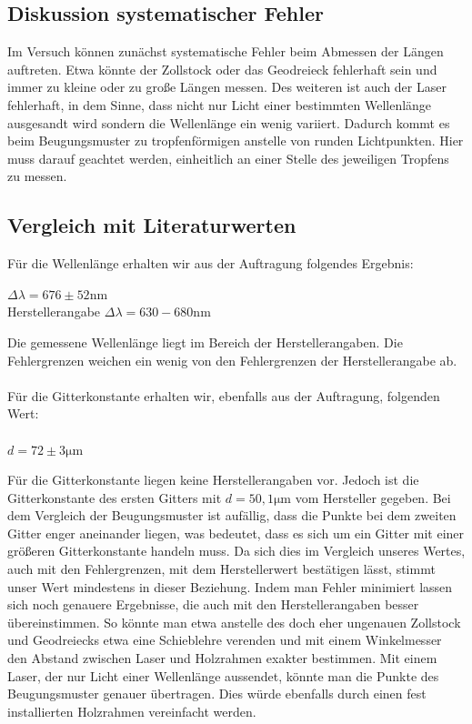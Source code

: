 \documentclass[12pt,a4paper,titlepage,headinclude,bibtotoc]{scrartcl}
\begin{document}
\subsection{Diskussion systematischer Fehler}
Im Versuch können zunächst systematische Fehler beim Abmessen der Längen auftreten. Etwa könnte der Zollstock oder das Geodreieck fehlerhaft sein und immer zu kleine oder zu große Längen messen. Des weiteren ist auch der Laser fehlerhaft, in dem Sinne, dass nicht nur Licht einer bestimmten Wellenlänge ausgesandt wird sondern die Wellenlänge ein wenig variiert. Dadurch kommt es beim Beugungsmuster zu tropfenförmigen anstelle von runden Lichtpunkten. Hier muss darauf geachtet werden, einheitlich an einer Stelle des jeweiligen Tropfens zu messen.

  
\subsection{Vergleich mit Literaturwerten}

Für die Wellenlänge erhalten wir aus der Auftragung folgendes Ergebnis:\\
\begin{center}
$\Delta \lambda = 676 \pm 52 \mathrm {nm} $\\
Herstellerangabe $ \Delta \lambda = 630-680 \mathrm {nm} $\\
\end{center}

Die gemessene Wellenlänge liegt im Bereich der Herstellerangaben. Die Fehlergrenzen weichen ein wenig von den Fehlergrenzen der Herstellerangabe ab.\\\\

Für die Gitterkonstante erhalten wir, ebenfalls aus der Auftragung, folgenden Wert:\\\\
\centering
$ d = 72 \pm 3 \mathrm{\mu m} $\\

\begin{flushleft}
Für die Gitterkonstante liegen keine Herstellerangaben vor. Jedoch ist die Gitterkonstante des ersten Gitters mit $d = 50,1 \mathrm{\mu m} $ vom Hersteller gegeben. Bei dem Vergleich der Beugungsmuster ist aufällig, dass die Punkte bei dem zweiten Gitter enger aneinander liegen, was bedeutet, dass es sich um ein Gitter mit einer größeren Gitterkonstante handeln muss. Da sich dies im Vergleich unseres Wertes, auch mit den Fehlergrenzen, mit dem Herstellerwert bestätigen lässt, stimmt unser Wert mindestens in dieser Beziehung.
\vspace{1cm}
Indem man Fehler minimiert lassen sich noch genauere Ergebnisse, die auch mit den Herstellerangaben besser übereinstimmen. So könnte man etwa anstelle des doch eher ungenauen Zollstock und Geodreiecks etwa eine Schieblehre verenden und mit einem Winkelmesser den Abstand zwischen Laser und Holzrahmen exakter bestimmen. Mit einem Laser, der nur Licht einer Wellenlänge aussendet, könnte man die Punkte des Beugungsmuster genauer übertragen. Dies würde ebenfalls durch einen fest installierten Holzrahmen vereinfacht werden.
\end{flushleft}
\end{document}
